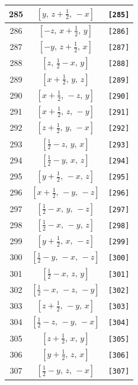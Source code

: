 \documentclass[fleqn,8pt]{jsarticle}
\begin{document}
\begin{longtable}{ccc}
285 & $\left[ y,\, z + \frac{1}{2},\, - x \right]$ & {\tt [285]} \\ \hline
286 & $\left[ - z,\, x + \frac{1}{2},\, y \right]$ & {\tt [286]} \\ \hline
287 & $\left[ - y,\, z + \frac{1}{2},\, x \right]$ & {\tt [287]} \\ \hline
288 & $\left[ z,\, \frac{1}{2} - x,\, y \right]$ & {\tt [288]} \\ \hline
289 & $\left[ x + \frac{1}{2},\, y,\, z \right]$ & {\tt [289]} \\ \hline
290 & $\left[ x + \frac{1}{2},\, - z,\, y \right]$ & {\tt [290]} \\ \hline
291 & $\left[ x + \frac{1}{2},\, z,\, - y \right]$ & {\tt [291]} \\ \hline
292 & $\left[ z + \frac{1}{2},\, y,\, - x \right]$ & {\tt [292]} \\ \hline
293 & $\left[ \frac{1}{2} - z,\, y,\, x \right]$ & {\tt [293]} \\ \hline
294 & $\left[ \frac{1}{2} - y,\, x,\, z \right]$ & {\tt [294]} \\ \hline
295 & $\left[ y + \frac{1}{2},\, - x,\, z \right]$ & {\tt [295]} \\ \hline
296 & $\left[ x + \frac{1}{2},\, - y,\, - z \right]$ & {\tt [296]} \\ \hline
297 & $\left[ \frac{1}{2} - x,\, y,\, - z \right]$ & {\tt [297]} \\ \hline
298 & $\left[ \frac{1}{2} - x,\, - y,\, z \right]$ & {\tt [298]} \\ \hline
299 & $\left[ y + \frac{1}{2},\, x,\, - z \right]$ & {\tt [299]} \\ \hline
300 & $\left[ \frac{1}{2} - y,\, - x,\, - z \right]$ & {\tt [300]} \\ \hline
301 & $\left[ \frac{1}{2} - x,\, z,\, y \right]$ & {\tt [301]} \\ \hline
302 & $\left[ \frac{1}{2} - x,\, - z,\, - y \right]$ & {\tt [302]} \\ \hline
303 & $\left[ z + \frac{1}{2},\, - y,\, x \right]$ & {\tt [303]} \\ \hline
304 & $\left[ \frac{1}{2} - z,\, - y,\, - x \right]$ & {\tt [304]} \\ \hline
305 & $\left[ z + \frac{1}{2},\, x,\, y \right]$ & {\tt [305]} \\ \hline
306 & $\left[ y + \frac{1}{2},\, z,\, x \right]$ & {\tt [306]} \\ \hline
307 & $\left[ \frac{1}{2} - y,\, z,\, - x \right]$ & {\tt [307]} \\ \hline

\end{longtable}
\end{document}
